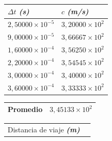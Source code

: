 \documentclass[twocolumn, 12pt]{article}
\newcommand{\bolditalic}[1]{\textbf{\textit{#1}}}
\begin{document}
\begin{table}[H]
    \begin{center}
        \begin{tabularx}{.9\linewidth}{|>{\centering\arraybackslash}X|>{\centering\arraybackslash}X|}
            \hline
            $\Delta t$ \bolditalic{(s)} & $c$ \bolditalic{(m/s)}  \\\hline
            $2,50000 \times 10^{-5}$    & $3,20000 \times 10^{2}$ \\\hline
            $9,00000 \times 10^{-5}$    & $3,66667 \times 10^{2}$ \\\hline
            $1,60000 \times 10^{-4}$    & $3,56250 \times 10^{2}$ \\\hline
            $2,20000 \times 10^{-4}$    & $3,54545 \times 10^{2}$ \\\hline
            $3,00000 \times 10^{-4}$    & $3,40000 \times 10^{2}$ \\\hline
            $3,60000 \times 10^{-4}$    & $3,33333 \times 10^{2}$ \\\hline
        \end{tabularx}
    \end{center}
\end{table}

\begin{table}[H]
    \begin{center}
        \begin{tabularx}{.9\linewidth}{|>{\centering\arraybackslash}X|>{\centering\arraybackslash}X|}
            \hline
            Promedio & $3,45133 \times 10^{2}$ \\\hline
        \end{tabularx}
    \end{center}
\end{table}

\vspace{-1cm}

\noindent\makebox[\linewidth]{\rule{.9\linewidth}{0.4pt}}

\begin{table}[H]
    \begin{center}
        \begin{tabularx}{.9\linewidth}{|>{\centering\arraybackslash}X|>{\centering\arraybackslash}X|}
            \hline
            \multicolumn{2}{|c|}{Constantes}                               \\\hline
            Distancia de viaje \bolditalic{(m)} & \multirow{2}{*}{$0,438$} \\\hline
        \end{tabularx}
    \end{center}
\end{table}
\end{document}
